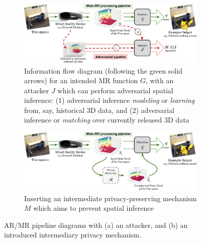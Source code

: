 \begin{figure}[t]
	\centering
	\vspace{2mm}
	\begin{subfigure}{\columnwidth}
		\includegraphics[width=\columnwidth]{figures/adversary-model-pipeline-v6-revised-a.pdf}
		\caption{\small Information flow diagram (following the green solid arrows) for an intended MR function $G$, with an attacker $J$ which can perform adversarial spatial inference: (1) adversarial inference \textit{modeling} or \textit{learning} from, say, historical 3D data, and (2) adversarial inference or \textit{matching} over currently released 3D data}
		\label{fig:generic-pipeline}
    	\vspace{3mm}
	\end{subfigure}
	\begin{subfigure}{\columnwidth}
		\includegraphics[width=\columnwidth]{figures/adversary-model-pipeline-v6-revised-b.pdf}
		\caption{\small Inserting an intermediate privacy-preserving mechanism $M$ which aims to prevent spatial inference}
		\label{fig:with-privacy-mechanism}
	\end{subfigure}
	\vspace{-3mm}
    \caption{\small AR/MR pipeline diagrams with (a) an attacker, and (b) an introduced intermediary privacy mechanism.}
	\label{fig:adversary-model-pipeline}
	\vspace{-3mm}
\end{figure}

